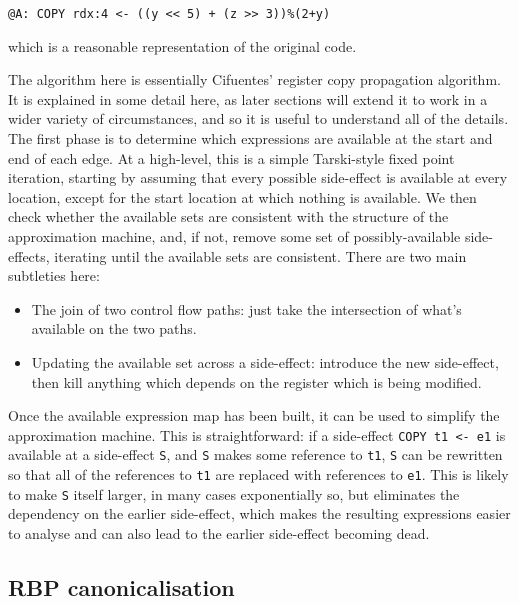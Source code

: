 \documentclass[12pt,a4paper]{book}
\begin{document}
\begin{verbatim}
@A: COPY rdx:4 <- ((y << 5) + (z >> 3))%(2+y)
\end{verbatim}

which is a reasonable representation of the original code.

The algorithm here is essentially Cifuentes' register copy propagation algorithm\needCite{}.
It is explained in some detail here, as later sections will extend it to work in a wider variety of circumstances, and so it is useful to understand all of the details.
The first phase is to determine which expressions are available at the start and end of each edge.
At a high-level, this is a simple Tarski-style fixed point iteration, starting by assuming that every possible side-effect is available at every location, except for the start location at which nothing is available.
We then check whether the available sets are consistent with the structure of the approximation machine, and, if not, remove some set of possibly-available side-effects, iterating until the available sets are consistent.
There are two main subtleties here:

\begin{itemize}
\item
  The join of two control flow paths: just take the intersection of what's available on the two paths.
\item
  Updating the available set across a side-effect: introduce the new side-effect, then kill anything which depends on the register which is being modified.
\end{itemize}


Once the available expression map has been built, it can be used to simplify the approximation machine.
This is straightforward: if a side-effect \verb|COPY t1 <- e1| is available at a side-effect \verb|S|, and \verb|S| makes some reference to \verb|t1|, \verb|S| can be rewritten so that all of the references to \verb|t1| are replaced with references to \verb|e1|.
This is likely to make \verb|S| itself larger, in many cases exponentially so, but eliminates the dependency on the earlier side-effect, which makes the resulting expressions easier to analyse and can also lead to the earlier side-effect becoming dead.

\subsection{RBP canonicalisation}
\label{sect:rbp_canonicalisation}
\end{document}
